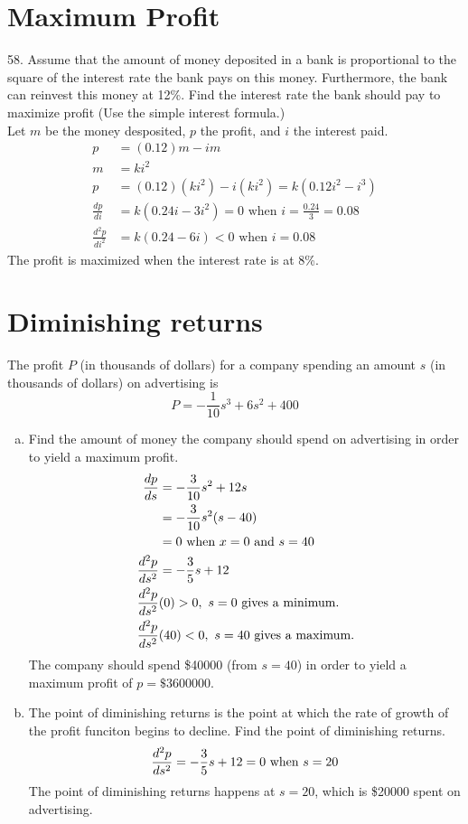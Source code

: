 \documentclass[11pt]{article}
\newcommand*{\set}{\setcounter{equation}{0}}
\begin{document}
\section{Maximum Profit}
58. Assume that the amount of money deposited in a bank is proportional to the square of the interest rate the bank pays on this money. Furthermore, the bank can reinvest this money at 12\%. Find the interest rate the bank should pay to maximize profit (Use the simple interest formula.)\\
\indent Let $m$ be the money desposited, $p$ the profit, and $i$ the interest paid.
\begin{align}
    p&=(0.12)m-im\\
    m&=ki^2\\
    p&=(0.12)(ki^2)-i(ki^2)=k(0.12i^2-i^3)\\
    \frac{dp}{di}&=k(0.24i-3i^2)=0\,\,\text{when}\,\, i=\frac{0.24}{3}=0.08\\
    \frac{d^2p}{di^2}&=k(0.24-6i)<0\,\,\text{when}\,\, i=0.08
\end{align}
The profit is maximized when the interest rate is at 8\%.

\section{Diminishing returns}
The profit $P$ (in thousands of dollars) for a company spending an amount $s$ (in thousands of dollars) on advertising is
\[P=-\frac{1}{10}s^3+6s^2+400\]
\begin{enumerate}[(a)]
    \item Find the amount of money the company should spend on advertising in order to yield a maximum profit.
        \begin{align}
            \set
            \frac{dp}{ds}&=-\frac{3}{10}s^2+12s\\
            &=-\frac{3}{10}s^2(s-40)\\
            &=0\,\,\text{when}\,\, x=0\,\,\text{and}\,\, s=40\\
            \frac{d^2p}{ds^2}&=-\frac{3}{5}s+12\\
            \frac{d^2p}{ds^2}&(0)>0,\,\, s=0\,\,\text{gives a minimum.}\\
            \frac{d^2p}{ds^2}&(40)<0,\,\, s=40\,\,\text{gives a maximum.}
        \end{align}
        The company should spend \$40000 (from $s=40$) in order to yield a maximum profit of $p=\$3600000$.
    \item The point of diminishing returns is the point at which the rate of growth of the profit funciton begins to decline. Find the point of diminishing returns.
        \begin{align}
            \set
            \frac{d^2p}{ds^2}=-\frac{3}{5}s+12=0\,\,\text{when}\,\, s=20
        \end{align}
        The point of diminishing returns happens at $s=20$, which is \$20000 spent on advertising.
\end{enumerate}
\end{document}
